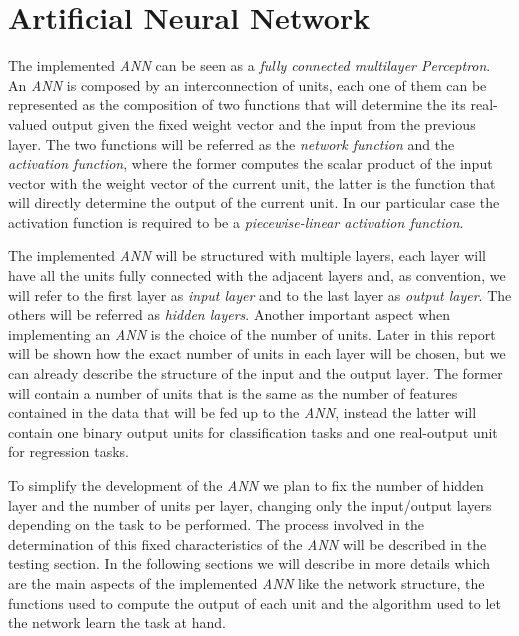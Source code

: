 \section{Artificial Neural Network}
\label{sec:ann}
The implemented \textit{ANN} can be seen as a \textit{fully connected multilayer Perceptron}. An \textit{ANN} is composed by an interconnection of units, each one of them can be represented as the composition of two functions that will determine the its real-valued output given the fixed weight vector and the input from the previous layer. The two functions will be referred as the \textit{network function} and the \textit{activation function}, where the former computes the scalar product of the input vector with the weight vector of the current unit, the latter is the function that will directly determine the output of the current unit. In our particular case the activation function is required to be a \textit{piecewise-linear activation function}.

The implemented \textit{ANN} will be structured with multiple layers, each layer will have all the units fully connected with the adjacent layers and, as convention, we will refer to the first layer as \textit{input layer} and to the last layer as \textit{output layer}. The others will be referred as \textit{hidden layers}. Another important aspect when implementing an \textit{ANN} is the choice of the number of units. Later in this report will be shown how the exact number of units in each layer will be chosen, but we can already describe the structure of the input and the output layer. The former will contain a number of units that is the same as the number of features contained in the data that will be fed up to the \textit{ANN}, instead the latter will contain one binary output units for classification tasks and one real-output unit for regression tasks.\newline

To simplify the development of the \textit{ANN} we plan to fix the number of hidden layer and the number of units per layer, changing only the input/output layers depending on the task to be performed. The process involved in the determination of this fixed characteristics of the \textit{ANN} will be described in the testing section.\newline
In the following sections we will describe in more details which are the main aspects of the implemented \textit{ANN} like the network structure, the functions used to compute the output of each unit and the algorithm used to let the network learn the task at hand.


